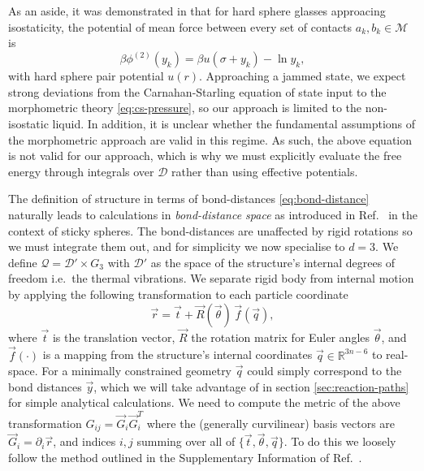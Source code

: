 \documentclass[11pt,twoside]{report}
\begin{document}
As an aside, it was demonstrated in \cite{BritoEEL2006} that for hard sphere glasses approacing isostaticity, the potential of mean force between every set of contacts $a_k,b_k \in \mathcal{M}$ is
\begin{equation*}
  \beta\phi^{(2)}(y_k) = \beta u(\sigma + y_k) - \ln{y_k},
\end{equation*}
with hard sphere pair potential $u(r)$.
Approaching a jammed state, we expect strong deviations from the Carnahan-Starling equation of state input to the morphometric theory \eqref{eq:cs-pressure}, so our approach is limited to the non-isostatic liquid.
In addition, it is unclear whether the fundamental assumptions of the morphometric approach are valid in this regime.
As such, the above equation is not valid for our approach, which is why we must explicitly evaluate the free energy through integrals over $\mathcal{D}$ rather than using effective potentials.

The definition of structure in terms of bond-distances \eqref{eq:bond-distance} naturally leads to calculations in \emph{bond-distance space} as introduced in Ref.\ \cite{Holmes-CerfonPNAS2013} in the context of sticky spheres.
The bond-distances are unaffected by rigid rotations so we must integrate them out, and for simplicity we now specialise to $d=3$.
We define%
$\mathcal{Q} = \mathcal{D}' \times G_3$ with $\mathcal{D}'$ as the space of the structure's internal degrees of freedom i.e.\ the thermal vibrations.
We separate rigid body from internal motion by applying the following transformation to each particle coordinate
\begin{equation*}
  \vec{r}
  =
  \vec{t} + \vec{R}(\vec{\theta}) \, \vec{f}(\vec{q}),
\end{equation*}
where $\vec{t}$ is the translation vector, $\vec{R}$ the rotation matrix for Euler angles $\vec{\theta}$, and $\vec{f}(\cdot)$ is a mapping from the structure's internal coordinates $\vec{q} \in \mathbb{R}^{3n-6}$ to real-space.
For a minimally constrained geometry $\vec{q}$ could simply correspond to the bond distances $\vec{y}$, which we will take advantage of in section \ref{sec:reaction-paths} for simple analytical calculations.
We need to compute the metric of the above transformation $G_{ij} = \vec{G}_i \vec{G}_i^T$ where the (generally curvilinear) basis vectors are $\vec{G}_i = \partial_i \vec{r}$, and indices $i,j$ summing over all of $\{\vec{t}, \vec{\theta}, \vec{q}\}$.
To do this we loosely follow the method outlined in the Supplementary Information of Ref.\ \cite{Holmes-CerfonPNAS2013}.
\end{document}
